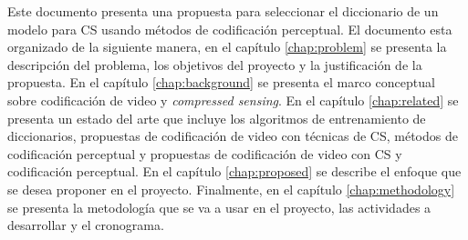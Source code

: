 Este documento presenta una propuesta para seleccionar el diccionario de un modelo para CS usando m\'etodos de codificaci\'on perceptual. El documento esta organizado de la siguiente manera, en el cap\'itulo \ref{chap:problem} se presenta la descripci\'on del problema, los objetivos del proyecto y la justificaci\'on de la propuesta. En el cap\'itulo \ref{chap:background} se presenta el marco conceptual sobre  codificaci\'on de video y \textit{compressed sensing}.  En el cap\'itulo \ref{chap:related} se presenta un estado del arte que incluye los algoritmos de entrenamiento de diccionarios, propuestas de codificaci\'on de video con t\'ecnicas de CS, m\'etodos de codificaci\'on perceptual y propuestas de codificaci\'on de video con CS y codificaci\'on perceptual. En el cap\'itulo \ref{chap:proposed} se describe el enfoque que se desea proponer en el proyecto. Finalmente, en el cap\'itulo \ref{chap:methodology} se presenta la metodolog\'ia que se va a usar en el proyecto, las actividades a desarrollar y el cronograma. 
